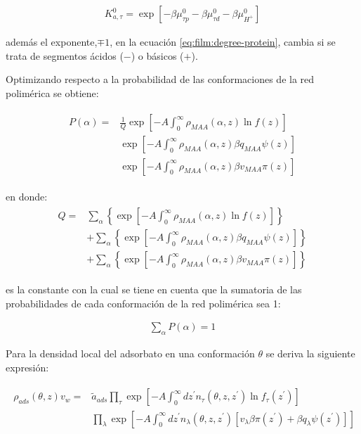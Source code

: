 \begin{align}
	K_{a,\tau}^0 = \exp[-\beta\mu^0_{\tau p} -\beta\mu^0_{\tau d} -\beta\mu^0_{H^+}]
	\label{eq:film:tau-acido-base}
\end{align}

\noindent adem\'as el exponente,$\mp 1$, en la ecuaci\'on \ref{eq:film:degree-protein}, cambia si se trata de segmentos \'acidos ($-$) o b\'asicos ($+$).

Optimizando respecto a la probabilidad de las conformaciones de la red polim\'erica se obtiene:

\begin{align}
	\begin{aligned}
	P(\alpha) = &\frac{1}{Q}\exp\left[ -A \int^\infty_0 \rho_{MAA}(\alpha, z) \ln f(z)\right] \\
	&\exp\left[ -A \int^\infty_0 \rho_{MAA}(\alpha, z) \beta q_{MAA} \psi(z)\right] \\
	& \exp\left[ -A \int^\infty_0 \rho_{MAA}(\alpha, z) \beta v_{MAA} \pi(z)\right] 
	\end{aligned}
	\label{eq:film:probabilidad}
\end{align}

\noindent en donde:
\begin{align}
	\begin{aligned}
		Q = &\sum_\alpha \left\{ \exp\left[ -A \int^\infty_0 \rho_{MAA}(\alpha, z) \ln f(z)\right]\right\} \\
		& + \sum_\alpha\left\{ \exp\left[ -A \int^\infty_0 \rho_{MAA}(\alpha, z) \beta q_{MAA} \psi(z)\right]  \right\} \\
		& + \sum_\alpha\left\{ \exp\left[ -A \int^\infty_0 \rho_{MAA}(\alpha, z) \beta v_{MAA} \pi(z)\right]  \right\} 
	\end{aligned}
\end{align}

\noindent es la constante con la cual se tiene en cuenta que la sumatoria de las probabilidades de cada conformaci\'on de la red polim\'erica sea 1:

\begin{align}
	\sum_\alpha P(\alpha) = 1                 
\end{align}

Para la densidad local del adsorbato en una conformaci\'on $\theta$ se deriva la siguiente expresi\'on:

\begin{align}
	\begin{aligned}
	\rho_{ads}(\theta, z)v_w = &\tilde{a}_{ads} \prod_\tau\exp\left[-A\int_0^\infty dz^\prime n_\tau(\theta,z,z^\prime) \ln f_\tau(z^\prime)\right] \\
	& \prod_\lambda \exp \left[-A\int^\infty_0 dz^\prime n_\lambda(\theta,z, z^\prime)[v_\lambda\beta\pi(z^\prime) + \beta q_\lambda \psi(z^\prime)] \right]
	\end{aligned}
\label{eq:film:proteina}
\end{align}

